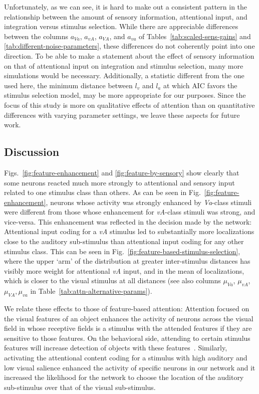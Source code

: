         Unfortunately, as we can see, it is hard to make out a consistent pattern in the relationship between the amount of sensory information, attentional input, and integration versus stimulus selection.
        While there are appreciable differences between the columns $a_\mathit{Va}$, $a_\mathit{vA}$, $a_\mathit{VA}$, and $a_\mathit{va}$ of Tables~\ref{tab:scaled-sens-gains} and \ref{tab:different-noise-parameters}, these differences do not coherently point into one direction.
        To be able to make a statement about the effect of sensory information on that of attentional input on integration and stimulus selection, many more simulations would be necessary.
        Additionally, a statistic different from the one used here, the minimum distance between $l_v$ and $l_a$ at which \ac{AIC} favors the stimulus selection model, may be more appropriate for our purposes.
        Since the focus of this study is more on qualitative effects of attention than on quantitative differences with varying parameter settings, we leave these aspects for future work.

\subsection{Discussion}
    Figs.~\ref{fig:feature-enhancement} and \ref{fig:feature-by-sensory} show clearly that some neurons reacted much more strongly to attentional and sensory input related to one stimulus class than others.
    As can be seen in Fig.~\ref{fig:feature-enhancement}, neurons whose activity was strongly enhanced by \textit{Va}-class stimuli were different from those whose enhancement for \textit{vA}-class stimuli was strong, and vice-versa.
    This enhancement was reflected in the decision made by the network:
    Attentional input coding for a \textit{vA} stimulus led to substantially more localizations close to the auditory sub-stimulus than attentional input coding for any other stimulus class.
    This can be seen in Fig.~\ref{fig:feature-based-stimulus-selection}, where the upper `arm' of the distribution at greater inter-stimulus distances has visibly more weight for attentional \textit{vA} input, and in the mean of localizations, which is closer to the visual stimulus at all distances (see also columns $\mu_\mathit{Va}$, $\mu_\mathit{vA}$, $\mu_\mathit{VA}, \mu_\mathit{va}$ in Table~\ref{tab:attn-alternative-params}). 
    
    We relate these effects to those of feature-based attention:
    Attention focused on the visual features of an object enhances the activity of neurons across the visual field in whose receptive fields is a stimulus with the attended features if they are sensitive to those features.
    On the behavioral side, attending to certain stimulus features will increase detection of objects with these features~\citep{maunsell-and-treue-2006,andersen-et-al-2009,born-et-al-2012}.
    Similarly, activating the attentional content coding for a stimulus with high auditory and low visual salience enhanced the activity of specific neurons in our network and it increased the likelihood for the network to choose the location of the auditory sub-stimulus over that of the visual sub-stimulus.

